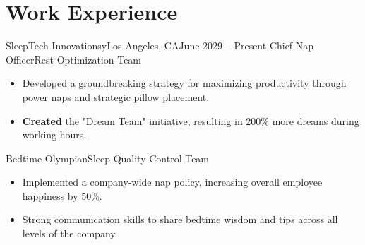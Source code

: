 \section{Work Experience}
  \resumeSubHeadingListStart

     \resumeSubheadingWork
      {SleepTech Innovationsy}{\hspace{-6em}Los Angeles, CA}{June 2029 -- Present}
      { Chief Nap Officer}{Rest Optimization Team}
      \begin{itemize}[label=\textbf{$\bullet$}]
        \setlength{\itemsep}{-0.15em} %
        \item{Developed a groundbreaking strategy for maximizing productivity through power naps and strategic pillow placement.}
        \item{\textbf{Created} the "Dream Team" initiative, resulting in 200\% more dreams during working hours.}
      \end{itemize}

      \vspace{-3.1em}

     \resumeSubheadingWork
      {}{}{}
      {Bedtime Olympian}{Sleep Quality Control Team}
      \begin{itemize}[label=\textbf{$\bullet$}]
        \setlength{\itemsep}{-0.15em} %
        \item{Implemented a company-wide nap policy, increasing overall employee happiness by 50\%.}
        \item{
          Strong communication skills to share bedtime wisdom and tips across all levels of the company.}
        \end{itemize}

